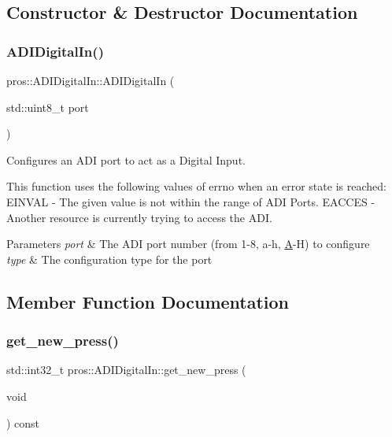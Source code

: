 \subsection{Constructor \& Destructor Documentation}
\mbox{\label{classpros_1_1ADIDigitalIn_a08fd8f876b569084bf375ef59116e4f7}} 
\subsubsection{\texorpdfstring{ADIDigitalIn()}{ADIDigitalIn()}}
{\footnotesize\ttfamily pros\+::\+A\+D\+I\+Digital\+In\+::\+A\+D\+I\+Digital\+In (\begin{DoxyParamCaption}\item[{std\+::uint8\+\_\+t}]{port }\end{DoxyParamCaption})}



Configures an A\+DI port to act as a Digital Input. 

This function uses the following values of errno when an error state is reached\+: E\+I\+N\+V\+AL -\/ The given value is not within the range of A\+DI Ports. E\+A\+C\+C\+ES -\/ Another resource is currently trying to access the A\+DI.


\begin{DoxyParams}{Parameters}
{\em port} & The A\+DI port number (from 1-\/8, \textquotesingle{}a\textquotesingle{}-\/\textquotesingle{}h\textquotesingle{}, \textquotesingle{}\mbox{\hyperlink{structA}{A}}\textquotesingle{}-\/\textquotesingle{}H\textquotesingle{}) to configure \\
\hline
{\em type} & The configuration type for the port \\
\hline
\end{DoxyParams}


\subsection{Member Function Documentation}
\mbox{\label{classpros_1_1ADIDigitalIn_a27d82a95e717eeee61ed6555952a93d8}} 
\subsubsection{\texorpdfstring{get\_new\_press()}{get\_new\_press()}}
{\footnotesize\ttfamily std\+::int32\+\_\+t pros\+::\+A\+D\+I\+Digital\+In\+::get\+\_\+new\+\_\+press (\begin{DoxyParamCaption}\item[{void}]{ }\end{DoxyParamCaption}) const}



